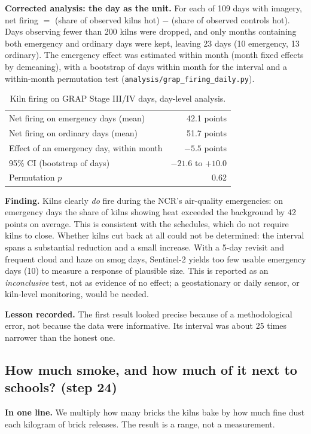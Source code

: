 \documentclass[11pt,a4paper]{article}
\begin{document}
\textbf{Corrected analysis: the day as the unit.} For each of 109 days with
imagery, net firing $=$ (share of observed kilns hot) $-$ (share of observed
controls hot). Days observing fewer than 200 kilns were dropped, and only months
containing both emergency and ordinary days were kept, leaving 23 days (10
emergency, 13 ordinary). The emergency effect was estimated within month (month
fixed effects by demeaning), with a bootstrap of days within month for the
interval and a within-month permutation test
(\texttt{analysis/grap\_firing\_daily.py}).

\begin{table}[H]
\centering\small
\begin{tabular}{@{}lr@{}}
\toprule
Net firing on emergency days (mean)             & 42.1 points \\
Net firing on ordinary days (mean)              & 51.7 points \\
Effect of an emergency day, within month         & $-5.5$ points \\
95\% CI (bootstrap of days)                      & $-21.6$ to $+10.0$ \\
Permutation $p$                                  & 0.62 \\
\bottomrule
\end{tabular}
\caption{Kiln firing on GRAP Stage III/IV days, day-level analysis.}
\end{table}

\textbf{Finding.} Kilns clearly \emph{do} fire during the NCR's air-quality
emergencies: on emergency days the share of kilns showing heat exceeded the
background by 42 points on average. This is consistent with the schedules, which
do not require kilns to close. Whether kilns cut back at all could not be
determined: the interval spans a substantial reduction and a small increase.
With a 5-day revisit and frequent cloud and haze on smog days, Sentinel-2 yields
too few usable emergency days (10) to measure a response of plausible size.
This is reported as an \emph{inconclusive} test, not as evidence of no effect;
a geostationary or daily sensor, or kiln-level monitoring, would be needed.

\textbf{Lesson recorded.} The first result looked precise because of a
methodological error, not because the data were informative. Its interval was
about 25 times narrower than the honest one.

\subsection{How much smoke, and how much of it next to schools? (step 24)}
\label{sec:emissions}
\textbf{In one line.} We multiply how many bricks the kilns bake by how much
fine dust each kilogram of brick releases. The result is a range, not a
measurement.
\end{document}
